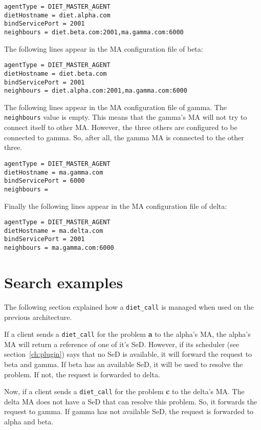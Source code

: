 \begin{verbatim}
agentType = DIET_MASTER_AGENT
dietHostname = diet.alpha.com
bindServicePort = 2001
neighbours = diet.beta.com:2001,ma.gamma.com:6000
\end{verbatim}

The following lines appear in the MA configuration file of beta:

\begin{verbatim}
agentType = DIET_MASTER_AGENT
dietHostname = diet.beta.com
bindServicePort = 2001
neighbours = diet.alpha.com:2001,ma.gamma.com:6000
\end{verbatim}

The following lines appear in the MA configuration file of gamma. The
\texttt{neighbours} value is empty. This means that the gamma's MA will not try
to connect itself to other MA. However, the three others are configured to be
connected to gamma. So, after all, the gamma MA is connected to the other
three.

\begin{verbatim}
agentType = DIET_MASTER_AGENT
dietHostname = ma.gamma.com
bindServicePort = 6000
neighbours = 
\end{verbatim}

Finally the following lines appear in the MA configuration file of delta:

\begin{verbatim}
agentType = DIET_MASTER_AGENT
dietHostname = ma.delta.com
bindServicePort = 2001
neighbours = ma.gamma.com:6000
\end{verbatim}

\section{Search examples}

The following section explained how a \texttt{diet\_call} is managed when used
on the previous architecture.

If a client sends a \texttt{diet\_call} for the problem \textbf{a} to the
alpha's MA, the alpha's MA will return a reference of one of it's SeD. However,
if its scheduler (see section~\ref{ch:plugin}) says that no SeD is available,
it will forward the request to beta and gamma. If beta has an available SeD, it
will be used to resolve the problem. If not, the request is forwarded to delta.

Now, if a client sends a \texttt{diet\_call} for the problem \textbf{c} to the
delta's MA. The delta MA does not have a SeD that can resolve this problem. So,
it forwards the request to gamma. If gamma has not available SeD, the request
is forwarded to alpha and beta.
